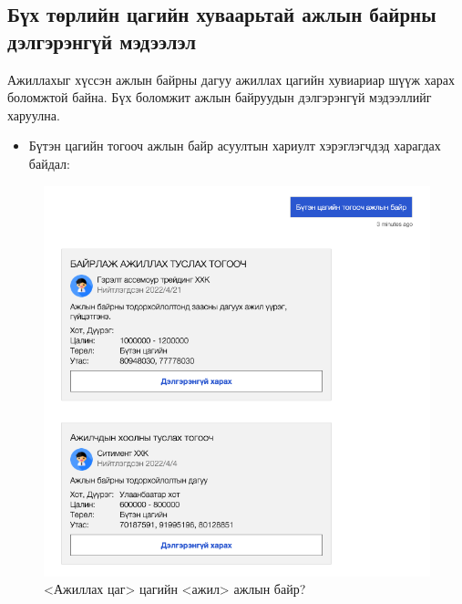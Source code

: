 \subsection{Бүх төрлийн цагийн хуваарьтай ажлын байрны дэлгэрэнгүй мэдээлэл}
Ажиллахыг хүссэн ажлын байрны дагуу ажиллах цагийн хувиариар шүүж харах боломжтой байна. Бүх боломжит ажлын байруудын дэлгэрэнгүй мэдээллийг харуулна.
\begin{itemize}
  \item Бүтэн цагийн тогооч ажлын байр асуултын хариулт хэрэглэгчдэд харагдах байдал:
\end{itemize}
\begin{figure}[ht]
  \centering
  \includegraphics[width=\textwidth-3.5cm]{images/question3.png}
  \caption{<Ажиллах цаг> цагийн <ажил> ажлын байр?}\label{fig:quest3}
\end{figure}
\newpage
